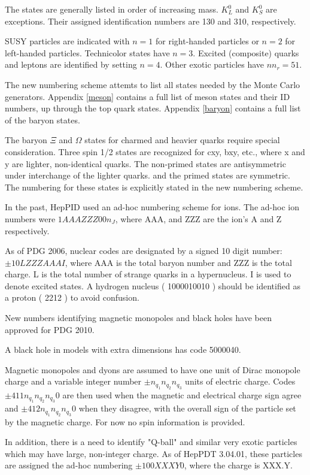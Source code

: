 The states are generally listed in order of increasing mass.  
$K_L^0$ and $K_S^0$ are exceptions.  Their assigned
identification numbers are 130 and 310, respectively.

SUSY particles are indicated with $n=1$ for right-handed particles or $n=2$
for left-handed particles.  Technicolor states have $n=3$.
Excited (composite) quarks and leptons are identified by setting $n=4$.
Other exotic particles have $n n_r=51$.

The new numbering scheme attemts to list all states needed by the
Monte Carlo generators.  Appendix \ref{meson}
contains a full list of meson states and their ID numbers, up through the
top quark states.   
Appendix \ref{baryon} contains a full list of the baryon states.

The baryon $\Xi$ and $\Omega$ states for charmed
and heavier quarks require special consideration.  
Three spin 1/2 states are recognized
for cxy, bxy, etc., where x and y are lighter, non-identical quarks.
The non-primed states are antisymmetric under interchange of the lighter quarks.
and the primed states are symmetric.  The numbering for these states is 
explicitly stated in the new numbering scheme.

In the past, HepPID used an ad-hoc numbering scheme for ions.  
The ad-hoc ion numbers were $1AAAZZZ00n_J$, where
AAA, and ZZZ are the ion's A and Z respectively.

As of PDG 2006\cite{scheme}, nuclear codes are designated by a 
signed 10 digit number: $\pm 10LZZZAAAI$, where 
AAA is the total baryon number and
ZZZ is the total charge.
L is the total number of strange quarks in a hypernucleus.  
I is used to denote excited states.
A hydrogen nucleus ( 1000010010 ) should be identified as a proton ( 2212 )
to avoid confusion.

New numbers identifying magnetic monopoles and black holes have been 
approved for PDG 2010.  

A black hole in models with extra dimensions has code 5000040.  

Magnetic monopoles and dyons are assumed to have one
unit of Dirac monopole charge and a variable integer number
$\pm n_{q_1}n_{q_2}n_{q_3}$ units of electric charge. 
Codes $\pm 411n_{q_1}n_{q_2}n_{q_3}0$ are then used when the magnetic and 
electrical charge sign agree and $\pm 412n_{q_1}n_{q_2}n_{q_3}0$  
when they disagree, with the overall sign of the particle set by the 
magnetic charge.  For now no spin information is provided.

In addition, there is a need to identify "Q-ball" and similar 
very exotic particles which may have large, non-integer charge.
As of HepPDT 3.04.01, these particles are assigned the ad-hoc numbering
$\pm 100XXXY0$, where the charge is XXX.Y.

